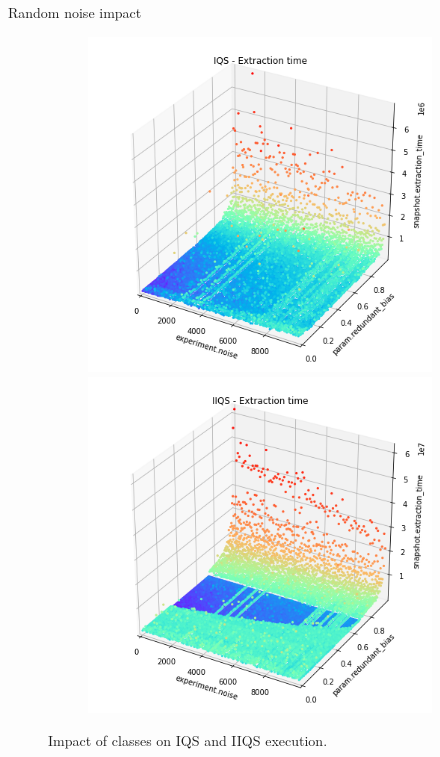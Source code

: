 \documentclass{beamer}
\begin{document}
\begin{frame}{Random noise impact}
    \begin{figure}
        \centering
        \begin{subfigure}[b]{\textwidth}
            \centering
            \includegraphics[height=0.6\textheight]{chapter4/01-basebenchmark-06-noise-bias.png.1-0.png}
            \includegraphics[height=0.6\textheight]{chapter4/01-basebenchmark-06-noise-bias.png.0-0.png}
        \end{subfigure}
        \caption{Impact of classes on IQS and IIQS execution.}
    \end{figure}
\end{frame}
\end{document}

